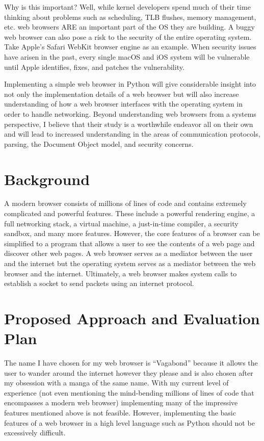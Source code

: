 \documentclass[12pt]{article}
\begin{document}
Why is this important?  Well, while kernel developers spend much of their time thinking about problems such as scheduling, TLB flushes, memory management, etc. web browsers ARE an important part of the OS they are building.  A buggy web browser can also pose a risk to the security of the entire operating system.  Take Apple’s Safari WebKit browser engine as an example.  When security issues have arisen in the past, every single macOS and iOS system will be vulnerable until Apple identifies, fixes, and patches the vulnerability.

Implementing a simple web browser in Python will give considerable insight into not only the implementation details of a web browser but will also increase understanding of how a web browser interfaces with the operating system in order to handle networking.  Beyond understanding web browsers from a systems perspective, I believe that their study is a worthwhile endeavor all on their own and will lead to increased understanding in the areas of communication protocols, parsing, the Document Object model, and security concerns.

\section{Background}

A modern browser consists of millions of lines of code and contains extremely complicated and powerful features.  These include a powerful rendering engine, a full networking stack, a virtual machine, a just-in-time compiler, a security sandbox, and many more features.  However, the core features of a browser can be simplified to a program that allows a user to see the contents of a web page and discover other web pages.  A web browser serves as a mediator between the user and the internet but the operating system serves as a mediator between the web browser and the internet.  Ultimately, a web browser makes system calls to establish a socket to send packets using an internet protocol.


\section{Proposed Approach and Evaluation Plan}

The name I have chosen for my web browser is “Vagabond” because it allows the user to wander around the internet however they please and is also chosen after my obsession with a manga of the same name.
With my current level of experience (not even mentioning the mind-bending millions of lines of code that encompasses a modern web browser) implementing many of the impressive features mentioned above is not feasible.  However, implementing the basic features of a web browser in a high level language such as Python should not be excessively difficult.
	
\end{document}
